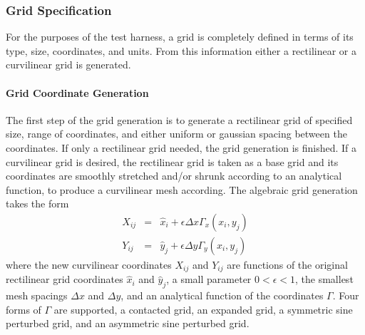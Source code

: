\subsubsection{Grid Specification}
\label{sec:harness_gridspecifier}
For the purposes of the test harness, a grid is completely defined in terms of its type, size, coordinates, and units. From this information either a rectilinear or a curvilinear grid is generated. 

\paragraph{Grid Coordinate Generation}
The first step of the grid generation is to generate a rectilinear grid of specified size, range of coordinates, and either uniform or gaussian spacing between the coordinates. If only a rectilinear grid needed, the grid generation is finished. If a curvilinear grid is desired, the rectilinear grid is taken as a base grid and its coordinates are smoothly stretched and/or shrunk according to an analytical function, to produce a curvilinear mesh according.  
The algebraic grid generation takes the form
\begin{eqnarray*}
X_{ij} &=& \hat{x}_{i} + \epsilon \Delta x \Gamma_{x}(x_{i},y_{j}) \\
Y_{ij} &=& \hat{y}_{j} + \epsilon \Delta y  \Gamma_{y}(x_{i},y_{j})
\end{eqnarray*}
where the new curvilinear coordinates $X_{ij}$ and $Y_{ij}$ are functions of  the original rectilinear grid coordinates $\hat{x}_{i}$ and $\hat{y}_{j}$, a small parameter $0 < \epsilon < 1$, the smallest mesh spacings $\Delta x$ and $\Delta y$, and an analytical function of the coordinates $\Gamma$. Four forms of $\Gamma$ are supported, a contacted grid, an expanded grid, a symmetric sine perturbed grid, and an asymmetric sine perturbed grid. 
